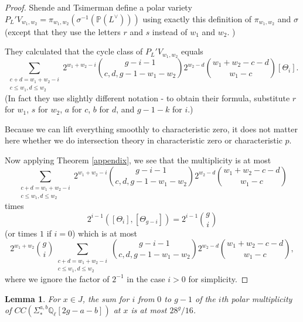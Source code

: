 \documentclass[12pt]{amsart}
\newtheorem{lemma}[theorem]{Lemma}
\theoremstyle{definition}
\theoremstyle{remark}
\begin{document}
\begin{proof}
Shende and Tsimerman define a polar variety $P_L'V_{w_1,w_2} = \pi_{w_1,w_2} (\sigma^{-1} (\mathbb P(L^\vee)))$ using exactly this definition of $\pi_{w_1,w_2}$ and $\sigma$ (except that they use the letters $r$ and $s$ instead of $w_1$ and $w_2$. )

They calculated \cite[Lemma 3.22]{TS} that the cycle class of  $P_L'V_{w_1,w_2}$ equals
\[    \sum_{\substack{c+d = w_1+w_2 -i \\ c \leq w_1, d\leq w_2 }} 2^{ w_1+w_2-i}  {g-i-1 \choose c,d,g-1-w_1-w_2} 2^{w_2-d} {w_1 + w_2 -c -d \choose w_1 -c }  [\Theta_i].\]   
(In fact they use slightly different notation - to obtain their formula, substitute $r$ for $w_1$, $s$ for $w_2$, $a$ for $c$, $b$ for $d$, and $g-1-k$ for $i$.)

Because we can lift everything smoothly to characteristic zero, it does not matter here whether we do intersection theory in characteristic zero or characteristic $p$.


Now applying Theorem \ref{appendix}, we see that the multiplicity is at most \[\sum_{\substack{c+d = w_1+w_2 -i \\ c \leq w_1, d\leq w_2 }} 2^{ w_1+w_2-i}  {g-i-1 \choose c,d,g-1-w_1-w_2} 2^{w_2-d} {w_1 + w_2 -c -d \choose w_1 -c }   \] times \[  2^{i-1} ([\Theta_i], [\Theta_{g-i}] )= 2^{i-1} {g \choose i} \]
(or times $1$ if $i=0$) which is at most  \[ 2^{w_1 +w_2} { g \choose i} \sum_{\substack{c+d = w_1+w_2 -i \\ c \leq w_1, d\leq w_2 }} {g-i-1 \choose c,d,g-1-w_1-w_2} 2^{w_2-d} {w_1 + w_2 -c -d \choose w_1 -c },\] where we ignore the factor of $2^{-1}$ in the case $i>0$ for simplicity.

\end{proof} 


\begin{lemma}\label{global-polar-bound} For $x \in J$, the sum for $i$ from $0$ to $g-1$ of the $i$th polar multiplicity of $CC ( \Sigma^{a,b}_* \mathbb Q_\ell[2g-a-b] )$ at $x$ is at most $28^g/16$. \end{lemma}
\end{document}

